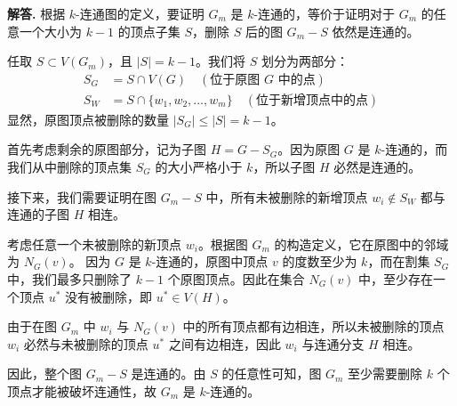 \documentclass[12pt, a4paper, oneside]{ctexart}
\newenvironment{solution}{\par\noindent\textbf{解答. }}{\par}
\begin{document}
\begin{solution}
根据 $k$-连通图的定义，要证明 $G_m$ 是 $k$-连通的，等价于证明对于 $G_m$ 的任意一个大小为 $k-1$ 的顶点子集 $S$，删除 $S$ 后的图 $G_m - S$ 依然是连通的。

任取 $S \subset V(G_m)$，且 $|S| = k-1$。我们将 $S$ 划分为两部分：
\begin{align*}
    S_G &= S \cap V(G) \quad (\text{位于原图 } G \text{ 中的点}) \\
    S_W &= S \cap \{w_1, w_2, \dots, w_m\} \quad (\text{位于新增顶点中的点})
\end{align*}
显然，原图顶点被删除的数量 $|S_G| \leqslant |S| = k-1$。

首先考虑剩余的原图部分，记为子图 $H = G - S_G$。因为原图 $G$ 是 $k$-连通的，而我们从中删除的顶点集 $S_G$ 的大小严格小于 $k$，所以子图 $H$ 必然是连通的。

接下来，我们需要证明在图 $G_m - S$ 中，所有未被删除的新增顶点 $w_i \notin S_W$ 都与连通的子图 $H$ 相连。

考虑任意一个未被删除的新顶点 $w_i$。根据图 $G_m$ 的构造定义，它在原图中的邻域为 $N_G(v)$。
因为 $G$ 是 $k$-连通的，原图中顶点 $v$ 的度数至少为 $k$，而在割集 $S_G$ 中，我们最多只删除了 $k-1$ 个原图顶点。因此在集合 $N_G(v)$ 中，至少存在一个顶点 $u^*$ 没有被删除，即 $u^* \in V(H)$。

由于在图 $G_m$ 中 $w_i$ 与 $N_G(v)$ 中的所有顶点都有边相连，所以未被删除的顶点 $w_i$ 必然与未被删除的顶点 $u^*$ 之间有边相连，因此 $w_i$ 与连通分支 $H$ 相连。

因此，整个图 $G_m - S$ 是连通的。由 $S$ 的任意性可知，图 $G_m$ 至少需要删除 $k$ 个顶点才能被破坏连通性，故 $G_m$ 是 $k$-连通的。
\end{solution}
\end{document}
